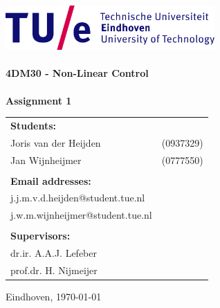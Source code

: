 \begin{titlepage}

\begin{center}

\includegraphics[width=0.6\textwidth]{./Figures/TUe}~\\[2cm]



\HRule \\[0.4cm]
{ \huge \bfseries 4DM30 - Non-Linear Control\\[0.3cm] }
\HRule \\[1.5cm]
\textbf{Assignment 1}



\vfill

\begin{table}[h]
\begin{tabular}{ll}
\textbf{Students:} & \\
Joris van der Heijden & (0937329)\\
Jan Wijnheijmer & (0777550)\\

\\
\textbf{Email addresses:} & \\
j.j.m.v.d.heijden@student.tue.nl \\
j.w.m.wijnheijmer@student.tue.nl\\
\\
\textbf{Supervisors:} &\\
dr.ir. A.A.J. Lefeber  &\\
prof.dr. H. Nijmeijer
\\

\end{tabular}
\end{table}



\large
{ Eindhoven, \today}

\end{center}

\end{titlepage}
